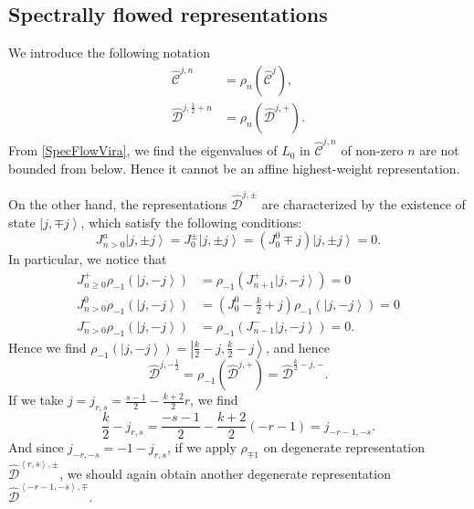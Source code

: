 \documentclass[10pt,a4paper]{article}
\numberwithin{equation}{section}
\newcommand{\ket}[1]{\left| #1 \right\rangle}
\newcommand{\vev}[1]{\left\langle #1 \right\rangle}
\begin{document}
\subsection{Spectrally flowed representations}
We introduce the following notation 
\begin{equation}
    \begin{aligned}
        \hat{\mathcal{C}}^{j,n} &= \rho_{n} \left( \hat{\mathcal{C}}^{j} \right),\\
        \hat{\mathcal{D}}^{j, \frac{1}{2} + n} &= \rho_{n} \left( \hat{\mathcal{D}}^{j, +} \right).
    \end{aligned}
\end{equation}
From \ref{SpecFlowVira}, we find the eigenvalues of $L_{0}$ in $\hat{\mathcal{C}}^{j,n}$ of non-zero $n$ are not bounded from below. Hence 
it cannot be an affine highest-weight representation.\\
\par On the other hand, the representations $\hat{\mathcal{D}}^{j,\pm}$ are characterized by the existence of state $\ket{j,\mp j}$, 
which satisfy the following conditions:
\begin{equation}
    J^{a}_{n>0} \ket{j,\pm j} = J^{\pm}_{0} \ket{j,\pm j} = (J^{0}_{0} \mp j) \ket{j,\pm j} =0.
\end{equation}
In particular, we notice that 
\begin{equation}
    \begin{aligned}
        J^{+}_{n \geq 0} \rho_{-1}(\ket{j,-j}) &= \rho_{-1} \left( J^{+}_{n+1} \ket{j,-j} \right)  = 0 \\
        J^{0}_{n > 0} \rho_{-1}(\ket{j,-j}) & =  (J^{0}_{0} - \frac{k}{2} +j)\rho_{-1}\left(\ket{j,-j}\right) = 0\\
        J^{-}_{n>0} \rho_{-1}(\ket{j,-j}) &= \rho_{-1} \left( J^{-}_{n-1} \ket{j,-j} \right)  =  0.
    \end{aligned}
\end{equation}
Hence we find $\rho_{-1} (\ket{j,-j}) = \ket{\frac{k}{2}-j, \frac{k}{2}-j}$, and hence 
\begin{equation}
    \hat{\mathcal{D}}^{j,-\frac{1}{2}} = \rho_{-1} \left( \hat{\mathcal{D}}^{j,+} \right) = \hat{\mathcal{D}}^{\frac{k}{2}-j,-}.
\end{equation}
If we take $j = j_{r,s} = \frac{s-1}{2} - \frac{k+2}{2} r$, we find 
\begin{equation}
    \frac{k}{2} - j_{r,s} = \frac{-s-1}{2} - \frac{k+2}{2} (-r-1) = j_{-r-1,-s}. \label{SpecDegSpin}
\end{equation}
And since $j_{-r,-s} = -1 - j_{r,s}$, if we apply $\rho_{\mp 1}$ on degenerate representation $\hat{\mathcal{D}}^{\vev{r,s},\pm}$, 
we should again obtain another degenerate representation $\hat{\mathcal{D}}^{\vev{-r-1,-s},\mp}$.
\end{document}
